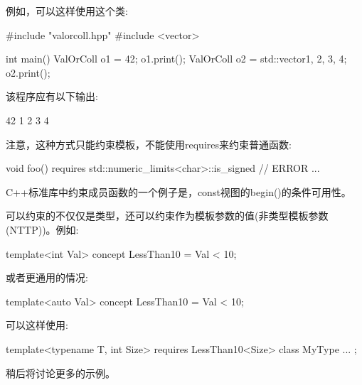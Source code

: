 例如，可以这样使用这个类:


\begin{cpp}
#include "valorcoll.hpp"
#include <vector>

int main()
{
	ValOrColl o1 = 42;
	o1.print();
	ValOrColl o2 = std::vector{1, 2, 3, 4};
	o2.print();
}
\end{cpp}

该程序应有以下输出:

\begin{shell}
42
1 2 3 4
\end{shell}

注意，这种方式只能约束模板，不能使用requires来约束普通函数:

\begin{cpp}
void foo() requires std::numeric_limits<char>::is_signed // ERROR
{
	...
}
\end{cpp}

C++标准库中约束成员函数的一个例子是，const视图的begin()的条件可用性。


可以约束的不仅仅是类型，还可以约束作为模板参数的值(非类型模板参数(NTTP))。例如:

\begin{cpp}
template<int Val>
concept LessThan10 = Val < 10;
\end{cpp}

或者更通用的情况:

\begin{cpp}
template<auto Val>
concept LessThan10 = Val < 10;
\end{cpp}

可以这样使用:

\begin{cpp}
template<typename T, int Size>
requires LessThan10<Size>
class MyType {
	...
};
\end{cpp}

稍后将讨论更多的示例。










